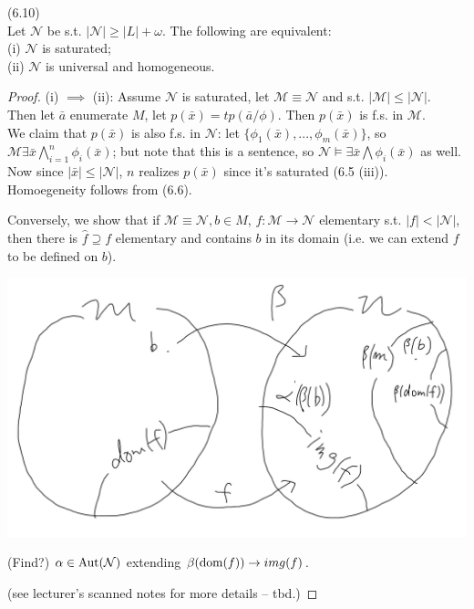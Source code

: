 \documentclass[a4paper]{article}
\begin{document}
\begin{thm} (6.10)\\
    Let $\mathcal{N}$ be s.t. $|\mathcal{N}| \geq |L|+\omega$. The following are equivalent:\\
    (i) $\mathcal{N}$ is saturated;\\
    (ii) $\mathcal{N}$ is universal and homogeneous.
    \begin{proof}
        (i) $\implies$ (ii): Assume $\mathcal{N}$ is saturated, let $\mathcal{M} \equiv \mathcal{N}$ and s.t. $|\mathcal{M}| \leq |\mathcal{N}|$.\\
        Then let $\bar{a}$ enumerate $M$, let $p(\bar{x}) = tp(\bar{a}/\phi)$. Then $p(\bar{x})$ is f.s. in $\mathcal{M}$.\\
        We claim that $p(\bar{x})$ is also f.s. in $\mathcal{N}$: let $\{\phi_1(\bar{x}),...,\phi_m(\bar{x})\}$, so $\mathcal{M} \exists \bar{x} \bigwedge_{i=1}^n \phi_i(\bar{x})$; but note that this is a sentence, so $\mathcal{N} \vDash \exists \bar{x} \bigwedge \phi_i(\bar{x})$ as well.\\
        Now since $|\bar{x}| \leq |\mathcal{N}|$, $n$ realizes $p(\bar{x})$ since it's saturated (6.5 (iii)). Homoegeneity follows from (6.6).

        Conversely, we show that if $\mathcal{M} \equiv \mathcal{N}, b \in M$, $f:\mathcal{M} \to \mathcal{N}$ elementary s.t. $|f| < |\mathcal{N}|$, then there is $\hat{f} \supseteq f$ elementary and contains $b$ in its domain (i.e. we can extend $f$ to be defined on $b$).

        \includegraphics[scale=0.5]{image/Model_11.png}

        (Find?) $\alpha \in \operatorname{Aut}(\mathcal{N})$ extending $\beta(\operatorname{dom}(f)) \to img(f)$.

        (see lecturer's scanned notes for more details -- tbd.)
    \end{proof}
\end{thm}
\end{document}
